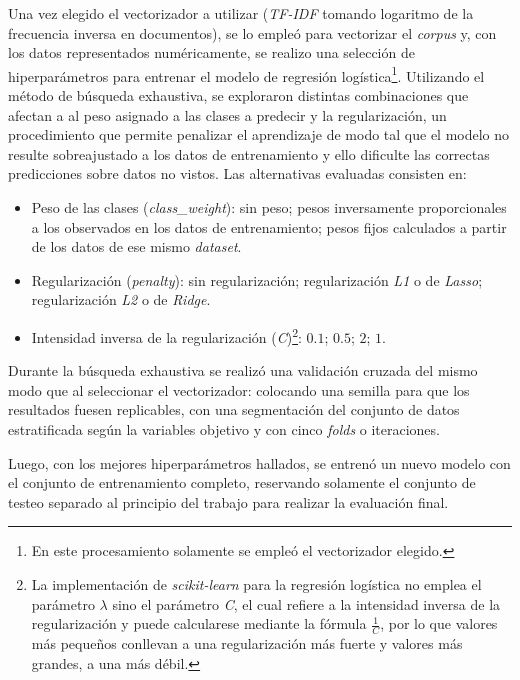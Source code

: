 Una vez elegido el vectorizador a utilizar (\textit{TF-IDF} tomando
logaritmo de la frecuencia inversa en documentos), se lo emple\'o para
vectorizar el \textit{corpus} y, con los datos representados
num\'ericamente, se realizo una selecci\'on
de hiperpar\'ametros para entrenar el modelo de regresi\'on log\'istica\footnote{
En este procesamiento solamente se emple\'o el vectorizador elegido.}.
Utilizando el m\'etodo de b\'usqueda exhaustiva, se
exploraron distintas combinaciones que afectan a
al peso asignado a las clases a predecir y la regularizaci\'on,
un procedimiento que permite penalizar el aprendizaje de modo tal que
el modelo no resulte sobreajustado a los datos de entrenamiento y ello
dificulte las correctas predicciones sobre datos no vistos. Las
alternativas evaluadas consisten en:

\begin{itemize}
    \item Peso de las clases (\textit{class\_weight}): sin peso; pesos
    inversamente proporcionales a los observados en los datos de entrenamiento;
    pesos fijos calculados a partir de los datos de ese mismo \textit{dataset}.    
    \item Regularizaci\'on (\textit{penalty}): sin regularizaci\'on;
    regularizaci\'on \textit{L1}
    o de \textit{Lasso}; regularizaci\'on \textit{L2} o de \textit{Ridge}.
    \item Intensidad inversa de la regularizaci\'on (\textit{C})\footnote{
    La implementaci\'on de \textit{scikit-learn} para la regresi\'on
    log\'istica no emplea el par\'ametro $\lambda$ sino el par\'ametro \textit{C},
    el cual refiere a la intensidad inversa de la regularizaci\'on y puede
    calcularese mediante la f\'ormula $\frac{1}{C}$, por lo que valores
    m\'as pequeños conllevan a una regularizaci\'on m\'as fuerte y valores m\'as
    grandes, a una m\'as d\'ebil.}:
     $0.1$; $0.5$; $2$; $1$.
\end{itemize}

Durante la b\'usqueda exhaustiva se realiz\'o una validaci\'on cruzada del mismo
modo que al seleccionar el vectorizador: colocando una semilla para que los
resultados fuesen replicables, con una segmentaci\'on del conjunto de datos
estratificada seg\'un la variables objetivo y con cinco \textit{folds} o
iteraciones.
\par
Luego, con los mejores hiperpar\'ametros hallados, se entren\'o un nuevo modelo
con el conjunto de entrenamiento completo, reservando solamente el
conjunto de testeo separado al principio del trabajo
para realizar la evaluaci\'on final.
